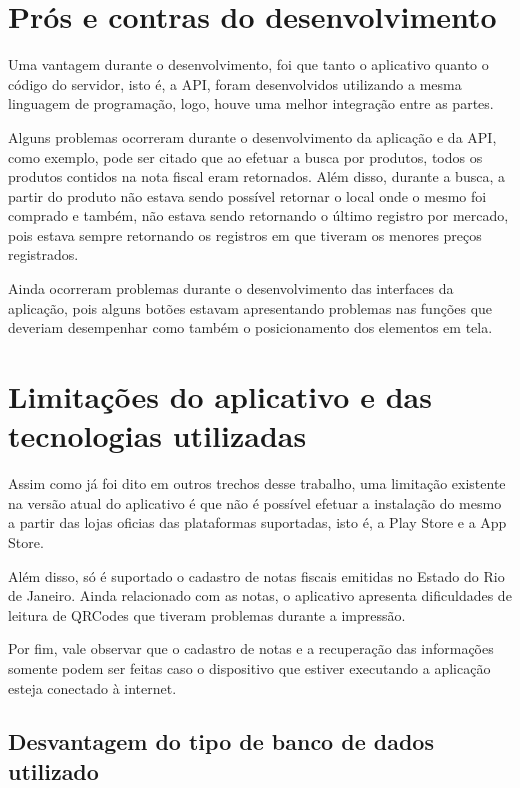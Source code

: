 \section{Prós e contras do desenvolvimento}

Uma vantagem durante o desenvolvimento, foi que tanto o aplicativo quanto o código do servidor, isto é, a API, foram desenvolvidos utilizando a mesma linguagem de programação, logo, houve uma melhor integração entre as partes.

Alguns problemas ocorreram durante o desenvolvimento da aplicação e da API, como exemplo, pode ser citado que ao efetuar a busca por produtos, todos os produtos contidos na nota fiscal eram retornados. Além disso, durante a busca, a partir do produto não estava sendo possível retornar o local onde o mesmo foi comprado e também, não estava sendo retornando o último registro por mercado, pois estava sempre retornando os registros em que tiveram os menores preços registrados.

Ainda ocorreram problemas durante o desenvolvimento das interfaces da aplicação, pois alguns botões estavam apresentando problemas nas funções que deveriam desempenhar como também o posicionamento dos elementos em tela.

\section{Limitações do aplicativo e das tecnologias utilizadas}

Assim como já foi dito em outros trechos desse trabalho, uma limitação existente na versão atual do aplicativo é que não é possível efetuar a instalação do mesmo a partir das lojas oficias das plataformas suportadas, isto é, a Play Store e a App Store.

Além disso, só é suportado o cadastro de notas fiscais emitidas no Estado do Rio de Janeiro. Ainda relacionado com as notas, o aplicativo apresenta dificuldades de leitura de QRCodes que tiveram problemas durante a impressão.

Por fim, vale observar que o cadastro de notas e a recuperação das informações somente podem ser feitas caso o dispositivo que estiver executando a aplicação esteja conectado à internet.

\subsection{Desvantagem do tipo de banco de dados utilizado}

